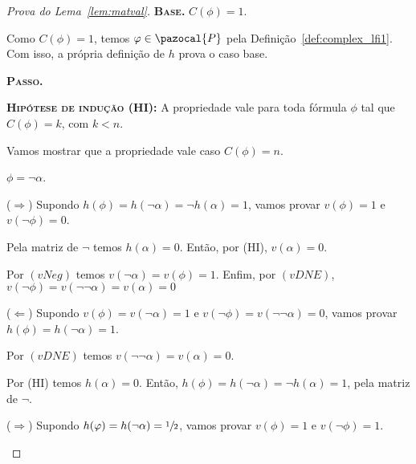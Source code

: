 \begin{proof}[Prova do Lema~\ref{lem:matval}]
        \noindent \textbf{\textsc{Base.}} $C(\phi) = 1$.

        Como $C(\phi) = 1$, temos $\phi \in \pazocal{P}$ pela Definição~\ref{def:complex_lfi1}. Com isso, a própria definição de $h$ prova o caso base.

        
        \noindent \textbf{\textsc{Passo.}} 

        \noindent \textbf{\textsc{Hipótese de indução (HI):}} A propriedade vale para toda fórmula $\phi$ tal que $C(\phi) = k$, com $k < n$.

        Vamos mostrar que a propriedade vale caso $C(\phi) = n$.

        \begin{provaporcasos}
            \casodeprova{} $\phi = \neg \alpha$.
                
                \begin{provaporsubcasos}
                        
                        ($\Longrightarrow$) Supondo $h(\phi) = h(\neg \alpha) = \neg h(\alpha) = 1$, vamos provar $v(\phi) = 1$ e $v(\neg \phi) = 0$. 
                        
                        Pela matriz de $\neg$ temos $h(\alpha) = 0$. Então, por (HI), $v(\alpha) = 0$. 
                        
                        Por $(vNeg)$ temos $v(\neg \alpha) = v(\phi) = 1$. Enfim, por $(vDNE)$, $v(\neg \phi) = v(\neg \neg \alpha) = v(\alpha) = 0$
                        
                        
                        ($\Longleftarrow$) Supondo $v(\phi) = v(\neg \alpha) = 1$ e $v(\neg \phi) = v(\neg \neg \alpha) = 0$, vamos provar $h(\phi) = h(\neg \alpha) = 1$.
                        
                        Por $(vDNE)$ temos $v(\neg \neg \alpha) = v(\alpha) = 0$.
                        
                        Por (HI) temos $h(\alpha) = 0$. Então, $h(\phi) = h(\neg \alpha) = \neg h(\alpha) = 1$, pela matriz de $\neg$.
                    
                    
                        ($\Longrightarrow$) Supondo $h(\varphi) = h(\neg \alpha) = \sfrac{1}{2}{}$, vamos provar $v(\phi) = 1$ e $v(\neg \phi) = 1$.
                        

\end{provaporsubcasos}
\end{provaporcasos}
\end{proof}
